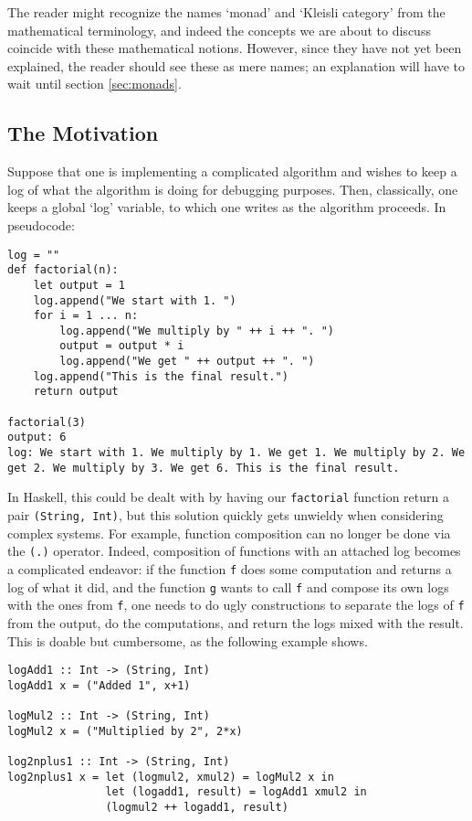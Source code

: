 \documentclass[11pt]{article}
\theoremstyle{nonumberplain}
\newcommand*\lsin{\lstinline}
\begin{document}
The reader might recognize the names `monad' and `Kleisli category' from the mathematical terminology, and indeed the concepts we are about to discuss coincide with these mathematical notions. However, since they have not yet been explained, the reader should see these as mere names; an explanation will have to wait until section \ref{sec:monads}.

\subsection{The Motivation}

Suppose that one is implementing a complicated algorithm and wishes to keep a log of what the algorithm is doing for debugging purposes. Then, classically, one keeps a global `log' variable, to which one writes as the algorithm proceeds. In pseudocode:
\begin{lstlisting}
log = ""
def factorial(n):
	let output = 1
	log.append("We start with 1. ")
	for i = 1 ... n:
		log.append("We multiply by " ++ i ++ ". ")
		output = output * i
		log.append("We get " ++ output ++ ". ")
	log.append("This is the final result.")
	return output

factorial(3)
output: 6
log: We start with 1. We multiply by 1. We get 1. We multiply by 2. We get 2. We multiply by 3. We get 6. This is the final result.
\end{lstlisting}

In Haskell, this could be dealt with by having our \lsin|factorial| function return a pair \lsin|(String, Int)|, but this solution quickly gets unwieldy when considering complex systems. For example, function composition can no longer be done via the \lsin|(.)| operator. Indeed, composition of functions with an attached log becomes a complicated endeavor: if the function \lsin|f| does some computation and returns a log of what it did, and the function \lsin|g| wants to call \lsin|f| and compose its own logs with the ones from \lsin|f|, one needs to do ugly constructions to separate the logs of \lsin|f| from the output, do the computations, and return the logs mixed with the result. This is doable but cumbersome, as the following example shows.
\begin{lstlisting}
logAdd1 :: Int -> (String, Int)
logAdd1 x = ("Added 1", x+1)

logMul2 :: Int -> (String, Int)
logMul2 x = ("Multiplied by 2", 2*x)

log2nplus1 :: Int -> (String, Int)
log2nplus1 x = let (logmul2, xmul2) = logMul2 x in
               let (logadd1, result) = logAdd1 xmul2 in
               (logmul2 ++ logadd1, result)
\end{lstlisting}
\end{document}
